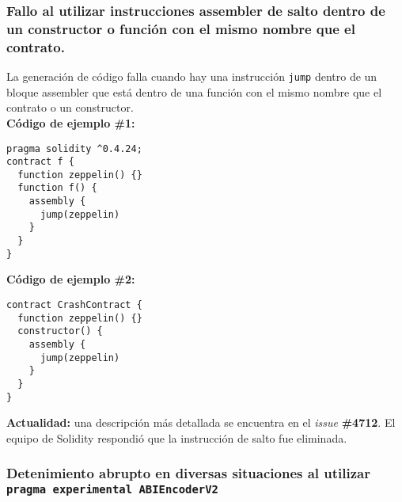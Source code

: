 \subsubsection{Fallo al utilizar instrucciones assembler de salto dentro de un constructor o función con el mismo nombre que el contrato.}

La generación de código falla cuando hay una instrucción \texttt{jump} dentro de un bloque assembler que está dentro de una función con el mismo nombre que el contrato o un constructor.\\

\textbf{Código de ejemplo \#1:}
\begin{lstlisting}[language=Solidity]
pragma solidity ^0.4.24;
contract f {
  function zeppelin() {}
  function f() {
    assembly {
      jump(zeppelin)
    }
  }
}
\end{lstlisting}

\textbf{Código de ejemplo \#2:}
\begin{lstlisting}[language=Solidity]
contract CrashContract {                                                                        
  function zeppelin() {}                                                                        
  constructor() {                                                                               
    assembly {                                                                                  
      jump(zeppelin)                                                                            
    }                                                                                           
  }                                                                                             
}
\end{lstlisting}

\textbf{Actualidad:} una descripción más detallada se encuentra en el \textit{issue} \textbf{\#4712}\cite{GHI4712}. El equipo de Solidity respondió que la instrucción de salto fue eliminada.\\

\subsubsection{Detenimiento abrupto en diversas situaciones al utilizar \texttt{pragma experimental ABIEncoderV2}}

